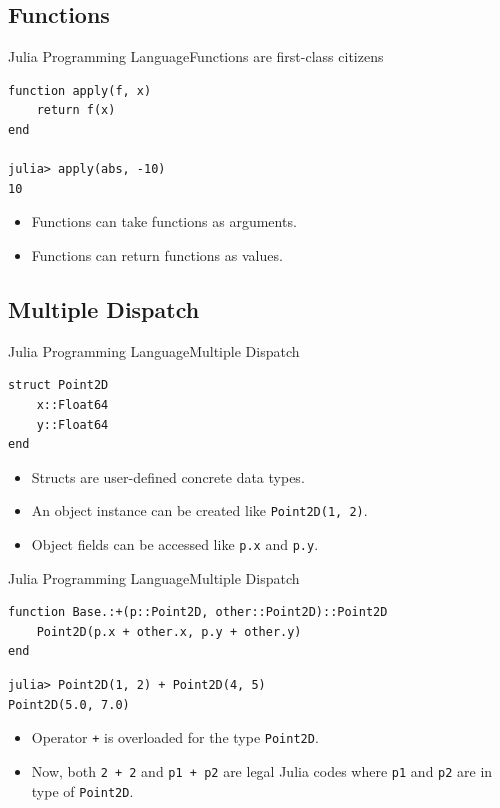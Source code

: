 \documentclass[11pt]{beamer}
\begin{document}
\subsection{Functions}
\begin{frame}[fragile]{Julia Programming Language}{Functions are first-class citizens}
\begin{lstlisting}
function apply(f, x)
	return f(x)
end 

julia> apply(abs, -10)
10
\end{lstlisting}
\begin{itemize}
\item Functions can take functions as arguments.
\item Functions can return functions as values.
\end{itemize}
\end{frame}


\subsection{Multiple Dispatch}
\begin{frame}[fragile]{Julia Programming Language}{Multiple Dispatch}
\begin{lstlisting}
struct Point2D 
	x::Float64
	y::Float64
end 
\end{lstlisting}
\begin{itemize}
\item Structs are user-defined concrete data types.
\item An object instance can be created like \texttt{Point2D(1, 2)}.
\item Object fields can be accessed like \texttt{p.x} and \texttt{p.y}.
\end{itemize}
\end{frame}


\begin{frame}[fragile]{Julia Programming Language}{Multiple Dispatch}
\begin{lstlisting}[basicstyle=\small]
function Base.:+(p::Point2D, other::Point2D)::Point2D
	Point2D(p.x + other.x, p.y + other.y)
end 
\end{lstlisting}
\begin{lstlisting}
julia> Point2D(1, 2) + Point2D(4, 5)
Point2D(5.0, 7.0)
\end{lstlisting}
\begin{itemize}
\item Operator \texttt{+} is overloaded for the type \texttt{Point2D}.
\item Now, both \texttt{2 + 2} and \texttt{p1 + p2} are legal Julia codes where \texttt{p1} and \texttt{p2} are in type of \texttt{Point2D}.
\end{itemize}
\end{frame}
\end{document}
